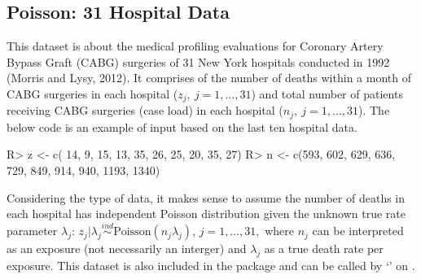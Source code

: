 \documentclass[article]{jss}
\begin{document}
\subsection{Poisson: 31 Hospital Data}
This dataset is about the medical profiling evaluations for Coronary Artery Bypass Graft (CABG) surgeries of 31 New York hospitals conducted in 1992 (Morris and Lysy, 2012). It comprises of the number of deaths within a month of CABG surgeries in each hospital ($z_{j},~j=1, \ldots, 31$) and total number of patients receiving CABG surgeries (case load) in each hospital ($n_{j},~j=1, \ldots, 31$). The below code is an example of input based on the last ten hospital data.
\begin{CodeChunk}
\begin{CodeInput}
R> z <- c( 14,   9,  15,  13,  35,  26,  25,  20,   35,   27)
R> n <- c(593, 602, 629, 636, 729, 849, 914, 940, 1193, 1340)
\end{CodeInput}
\end{CodeChunk}


Considering the type of data, it makes sense to assume the number of deaths in each hospital has independent Poisson distribution given the unknown true rate parameter $\lambda_{j}$: $z_{j}\vert \lambda_{j}\stackrel{ind}{\sim} \textrm{Poisson}(n_{j}\lambda_{j})$, $j=1, \ldots, 31,$ where $n_{j}$ can be interpreted as an exposure (not necessarily an interger) and $\lambda_{j}$ as a true death rate per exposure. This dataset is also included in the package and can be called by `' on .
\end{document}
